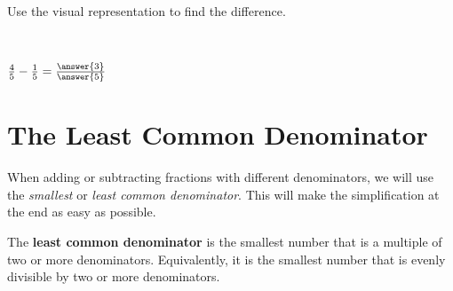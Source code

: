 \documentclass{ximera}
\begin{document}
\begin{problem}
Use the visual representation to find the difference.

~ \\[1em]

\begin{center}
\end{center}

$\frac{4}{5} - \frac{1}{5} = \frac{\answer{3}}{\answer{5}}$

\end{problem}


\section*{The Least Common Denominator}

When adding or subtracting fractions with different denominators, we will use the \emph{smallest} or \emph{least common denominator}.  This will
make the simplification at the end as easy as possible.

\begin{definition}

The \textbf{least common denominator} is the smallest number that is a multiple of two or more denominators.  Equivalently, it is the smallest number that is
evenly divisible by two or more denominators.

\end{definition}
\end{document}
